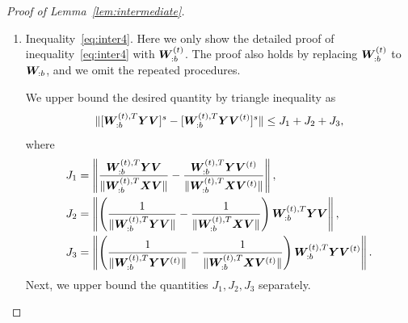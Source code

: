 \documentclass[lettersize,journal]{IEEEtran}
\theoremstyle{definition}
\theoremstyle{definition}
\newcommand{\of}[1]{\left(#1\right)}
\begin{document}
\begin{proof}[Proof of Lemma~\ref{lem:intermediate}]
\begin{enumerate}
    
    Therefore, combining the inequalities~\eqref{eq:i1}, \eqref{eq:i2}, and \eqref{eq:i3}, we finish the proof of inequality~\eqref{eq:inter3}.
    
    \item Inequality~\eqref{eq:inter4}. Here we only show the detailed proof of inequality~\eqref{eq:inter4} with $\bm{W}_{:b}^{(t)}$. The proof also holds by replacing $\bm{W}_{:b}^{(t)}$ to $\bm{W}_{:b}$, and we omit the repeated procedures.
    
    We upper bound the desired quantity by triangle inequality as
    \begin{equation}
         \lVert  [   \bm{W}_{:b}^{(t), T}  \bm Y \bm{V}]^s -  [  \bm{W}_{:b}^{(t), T}  \bm Y \bm{V}^{(t)}]^s \rVert  \leq J_1 + J_2 + J_3,
    \end{equation}
    where 
    \begin{align}
        J_1 &= \onorm{ \frac{\mW_{:b}^{(t),T} \mY \mV }{\onormSize{}{ \mW_{:b}^{(t),T} \mX \mV }} - \frac{\mW_{:b}^{(t),T} \mY \mV^{(t)} }{\onormSize{}{ \mW_{:b}^{(t),T} \mX \mV^{(t)} }}  },\\
        J_2 & = \onorm{\of{ \frac{1}{\onormSize{}{\mW_{:b}^{(t),T} \mY \mV}} -  \frac{1}{\onormSize{}{\mW_{:b}^{(t),T} \mX \mV}}  } \mW_{:b}^{(t),T} \mY \mV },\\
        J_3 &= \onorm{\of{ \frac{1}{\onormSize{}{\mW_{:b}^{(t),T} \mY \mV^{(t)}}} -  \frac{1}{\onormSize{}{\mW_{:b}^{(t),T} \mX \mV^{(t)}} }  } \mW_{:b}^{(t), T} \mY \mV^{(t)} }.
    \end{align}
    Next, we upper bound the quantities $J_1, J_2, J_3$ separately. 


\end{enumerate}
\end{proof}
\end{document}
